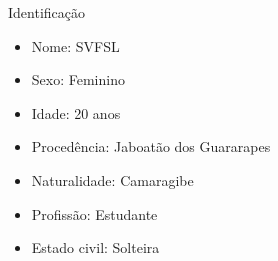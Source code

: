 \begin{frame}{Identificação}
\begin{itemize}
\item Nome: SVFSL
\item Sexo: Feminino
\item Idade: 20 anos
\item Procedência: Jaboatão dos Guararapes
\item Naturalidade: Camaragibe
\item Profissão: Estudante
\item Estado civil: Solteira
\end{itemize}
\end{frame}
